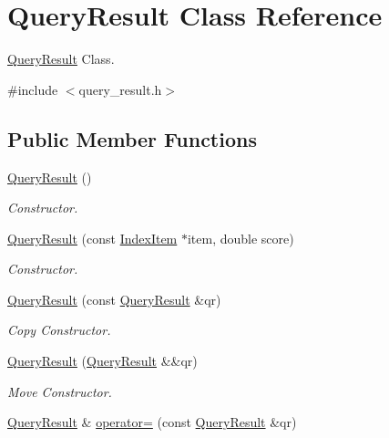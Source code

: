 \hypertarget{class_query_result}{}\section{Query\+Result Class Reference}
\label{class_query_result}


\hyperlink{class_query_result}{Query\+Result} Class.  




{\ttfamily \#include $<$query\+\_\+result.\+h$>$}

\subsection*{Public Member Functions}
\begin{DoxyCompactItemize}
\item 
\hyperlink{class_query_result_a23c0f8433d60025e81759f569dc08ab8}{Query\+Result} ()
\begin{DoxyCompactList}\small\item\em Constructor. \end{DoxyCompactList}\item 
\hyperlink{class_query_result_a4052497ab00536fed160dd0d0520d15f}{Query\+Result} (const \hyperlink{class_index_item}{Index\+Item} $\ast$item, double score)
\begin{DoxyCompactList}\small\item\em Constructor. \end{DoxyCompactList}\item 
\hyperlink{class_query_result_a702070b121570dbb10b47b264cabaa5f}{Query\+Result} (const \hyperlink{class_query_result}{Query\+Result} \&qr)
\begin{DoxyCompactList}\small\item\em Copy Constructor. \end{DoxyCompactList}\item 
\mbox{\label{class_query_result_a568a9db7e3935e4a24cc63e9ec0c80a7}} 
\hyperlink{class_query_result_a568a9db7e3935e4a24cc63e9ec0c80a7}{Query\+Result} (\hyperlink{class_query_result}{Query\+Result} \&\&qr)
\begin{DoxyCompactList}\small\item\em Move Constructor. \end{DoxyCompactList}\item 
\hyperlink{class_query_result}{Query\+Result} \& \hyperlink{class_query_result_a238ab498750ea7ed31b965a416cc5930}{operator=} (const \hyperlink{class_query_result}{Query\+Result} \&qr)

\end{DoxyCompactItemize}
